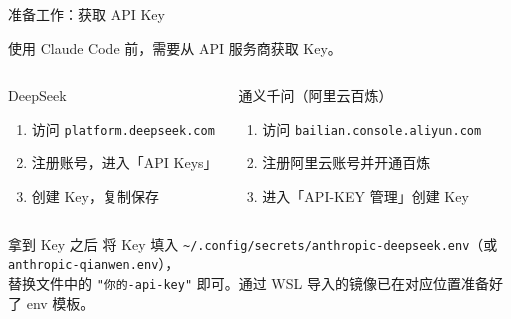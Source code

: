 \documentclass[aspectratio=169]{ctexbeamer}
\begin{document}
\begin{frame}{准备工作：获取 API Key}
\small

使用 Claude Code 前，需要从 API 服务商获取 Key。

\vspace{0.3cm}

\begin{columns}[T]
\begin{block}{DeepSeek}
\begin{enumerate}
  \setlength\itemsep{4pt}
  \item 访问 \texttt{platform.deepseek.com}
  \item 注册账号，进入「API Keys」
  \item 创建 Key，复制保存
\end{enumerate}
\end{block}

\begin{block}{通义千问（阿里云百炼）}
\begin{enumerate}
  \setlength\itemsep{4pt}
  \item 访问 \texttt{bailian.console.aliyun.com}
  \item 注册阿里云账号并开通百炼
  \item 进入「API-KEY 管理」创建 Key
\end{enumerate}
\end{block}
\end{columns}

\vspace{0.3cm}

\begin{alertblock}{拿到 Key 之后}
  将 Key 填入 \texttt{\textasciitilde/.config/secrets/anthropic-deepseek.env}（或 \texttt{anthropic-qianwen.env}），\\[2pt]
  替换文件中的 \texttt{"你的-api-key"} 即可。通过 WSL 导入的镜像已在对应位置准备好了 env 模板。
\end{alertblock}

\end{frame}
\end{document}
